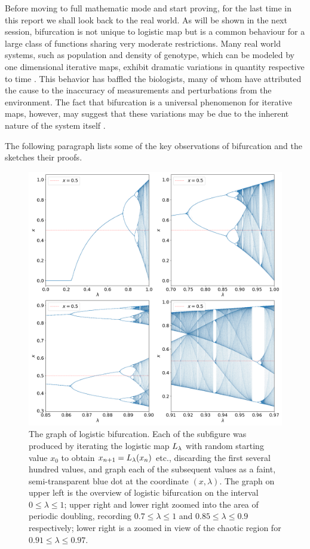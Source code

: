Before moving to full mathematic mode and start proving, for the last time in this report we shall look back to the real world. 
As will be shown in the next session, bifurcation is not unique to logistic map but is a common behaviour for a large class of functions sharing very moderate restrictions. 
Many real world systems, such as population and density of genotype, which can be modeled by one dimensional iterative maps, exhibit dramatic variations in quantity respective to time \cite{colorado_potato_beetle}.
This behavior has baffled the biologists, many of whom have attributed the cause to the inaccuracy of measurements and perturbations from the environment. 
The fact that bifurcation is a universal phenomenon for iterative maps, however, may suggest that these variations may be due to the inherent nature of the system itself \cite{genotype}.


The following paragraph lists some of the key observations of bifurcation and the sketches their proofs.

\begin{figure}[htbp]
	\centering
	\includegraphics[width=\textwidth]{./figures/logistic.png}
	\caption{
		The graph of logistic bifurcation.
		Each of the subfigure was produced by iterating the logistic map $L_{\lambda}$ with random starting value $x_0$ to obtain $x_{n+1} = L_{\lambda}(x_n)$ etc., discarding the first several hundred values, and graph each of the subsequent values as a faint, semi-transparent blue dot at the coordinate $(x, \lambda)$.
		The graph on upper left is the overview of logistic bifurcation on the interval $0 \leq \lambda \leq 1$; upper right and lower right zoomed into the area of periodic doubling, recording $0.7 \leq \lambda \leq 1$ and $0.85 \leq \lambda \leq 0.9$ respectively; lower right is a zoomed in view of the chaotic region for $ 0.91 \leq \lambda \leq 0.97$. 
	}
	\label{fig:logistic bifurcation overview}
\end{figure}

